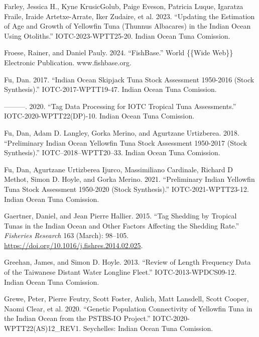 \documentclass[
]{scrartcl}
\newlength{\cslhangindent}
\newenvironment{CSLReferences}[2] %
 {\begin{list}{}{%
  \setlength{\itemindent}{0pt}
  \setlength{\leftmargin}{0pt}
  \setlength{\parsep}{0pt}
  \ifodd #1
   \setlength{\leftmargin}{\cslhangindent}
   \setlength{\itemindent}{-1\cslhangindent}
  \fi
  \setlength{\itemsep}{#2\baselineskip}}}
 {\end{list}}
\begin{document}
\begin{CSLReferences}{1}{0}
Farley, Jessica H., Kyne KrusicGolub, Paige Eveson, Patricia Luque,
Igaratza Fraile, Iraide Artetxe-Arrate, Iker Zudaire, et al. 2023.
{``Updating the Estimation of Age and Growth of Yellowfin Tuna
({Thunnus} Albacares) in the {Indian Ocean} Using Otoliths.''}
IOTC-2023-WPTT25-20. Indian Ocean Tuna Comission.

Froese, Rainer, and Daniel Pauly. 2024. {``{FishBase}.''} World \{\{Wide
Web\}\} Electronic Publication. www.fishbase.org.

Fu, Dan. 2017. {``Indian Ocean Skipjack Tuna Stock Assessment 1950-2016
({Stock Synthesis}).''} IOTC-2017-WPTT19-47. Indian Ocean Tuna
Comission.

---------. 2020. {``Tag Data Processing for {IOTC} Tropical Tuna
Assessments.''} IOTC-2020-WPTT22(DP)-10. Indian Ocean Tuna Comission.

Fu, Dan, Adam D. Langley, Gorka Merino, and Agurtzane Urtizberea. 2018.
{``Preliminary {Indian Ocean Yellowfin Tuna Stock Assessment} 1950-2017
({Stock Synthesis}).''} IOTC--2018--WPTT20--33. Indian Ocean Tuna
Comission.

Fu, Dan, Agurtzane Urtizberea Ijurco, Massimiliano Cardinale, Richard D
Methot, Simon D. Hoyle, and Gorka Merino. 2021. {``Preliminary {Indian
Yellowfin} Tuna Stock Assessment 1950-2020 ({Stock Synthesis}).''}
IOTC-2021-WPTT23-12. Indian Ocean Tuna Comission.

Gaertner, Daniel, and Jean Pierre Hallier. 2015. {``Tag Shedding by
Tropical Tunas in the {Indian Ocean} and Other Factors Affecting the
Shedding Rate.''} \emph{Fisheries Research} 163 (March): 98--105.
\url{https://doi.org/10.1016/j.fishres.2014.02.025}.

Greehan, James, and Simon D. Hoyle. 2013. {``Review of Length Frequency
Data of the {Taiwanese Distant Water Longline Fleet}.''}
IOTC-2013-WPDCS09-12. Indian Ocean Tuna Comission.

Grewe, Peter, Pierre Feutry, Scott Foster, Aulich, Matt Lansdell, Scott
Cooper, Naomi Clear, et al. 2020. {``Genetic Population Connectivity of
Yellowfin Tuna in the {Indian Ocean} from the {PSTBS-IO Project}.''}
IOTC-2020-WPTT22(AS)12\_REV1. Seychelles: Indian Ocean Tuna Comission.


\end{CSLReferences}
\end{document}
